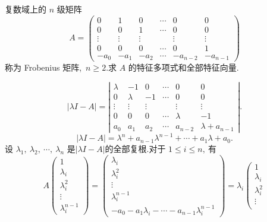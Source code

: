 \newpage
\begin{problem}
	复数域上的  $n$  级矩阵
	$$A=\left(\begin{array}{cccccc}
		0 & 1 & 0 & \cdots & 0 & 0 \\
		0 & 0 & 1 & \cdots & 0 & 0 \\
		\vdots & \vdots & \vdots & & \vdots & \vdots \\
		0 & 0 & 0 & \cdots & 0 & 1 \\
		-a_{0} & -a_{1} & -a_{2} & \cdots & -a_{n-2} & -a_{n-1}
	\end{array}\right)$$
	称为 Frobenius 矩阵,\  $ n \geqslant 2 .$求  $A $ 的特征多项式和全部特征向量.
\end{problem}
\begin{solution}
	$$|\lambda I-A|=\left|\begin{array}{cccccc}
		\lambda & -1 & 0 & \cdots & 0 & 0 \\
		0 & \lambda & -1 & \cdots & 0 & 0 \\
		\vdots & \vdots & \vdots & & \vdots & \vdots \\
		0 & 0 & 0 & \cdots & \lambda & -1 \\
		a_{0} & a_{1} & a_{2} & \cdots & a_{n-2} & \lambda+a_{n-1}
	\end{array}\right|.$$
	$$|\lambda I-A|=\lambda^{n}+a_{n-1} \lambda^{n-1}+\cdots+a_{1} \lambda+a_{0} .$$
	设 $ \lambda_{1},\  \lambda_{2},\  \cdots,\  \lambda_{n} $ 是$  |\lambda I-A|  $的全部复根.对于  $1 \leqslant i \leqslant n ,\  $有
	$$A\left(\begin{array}{c}
		1 \\
		\lambda_{i} \\
		\lambda_{i}^{2} \\
		\vdots \\
		\lambda_{i}^{n-1}
	\end{array}\right)=\left(\begin{array}{c}
		\lambda_{i} \\
		\lambda_{i}^{2} \\
		\vdots \\
		\lambda_{i}^{n-1} \\
		-a_{0}-a_{1} \lambda_{i}-\cdots-a_{n-1} \lambda_{i}^{n-1}
	\end{array}\right)=\lambda_{i}\left(\begin{array}{c}
		1 \\
		\lambda_{i} \\
		\lambda_{i}^{2} \\
		\vdots \\

\end{array}$$
\end{solution}
